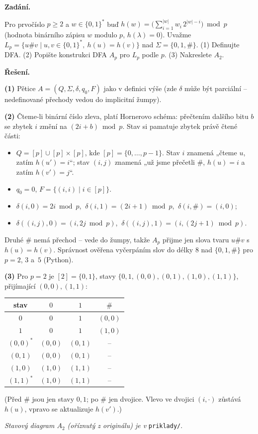 \documentclass[11pt,a4paper]{article}
\begin{document}
\begin{priklad}
\par
\textbf{Zadání.}\par
Pro prvočíslo $p\ge 2$ a $w\in\{0,1\}^*$ buď $h(w)=\big(\sum_{i=1}^{|w|}w_i\,2^{|w|-i}\big)\bmod p$ (hodnota binárního zápisu $w$ modulo $p$, $h(\lambda)=0$). Uvažme $L_p=\{u\#v\mid u,v\in\{0,1\}^*,\ h(u)=h(v)\}$ nad $\Sigma=\{0,1,\#\}$. (1) Definujte DFA. (2) Popište konstrukci DFA $A_p$ pro $L_p$ podle $p$. (3) Nakreslete $A_2$.

\smallskip
\textbf{Řešení.}\par
\textbf{(1)} Pětice $A=(Q,\Sigma,\delta,q_0,F)$ jako v definici výše (zde $\delta$ může být parciální -- nedefinované přechody vedou do implicitní žumpy).

\textbf{(2)} Čteme-li binární číslo zleva, platí Hornerovo schéma: přečtením dalšího bitu $b$ se zbytek $i$ změní na $(2i+b)\bmod p$. Stav si pamatuje zbytek právě čtené části:
\begin{itemize}
  \item $Q=[p]\cup[p]\times[p]$, kde $[p]=\{0,\dots,p-1\}$. Stav $i$ znamená „čteme $u$, zatím $h(u')=i$``; stav $(i,j)$ znamená „už jsme přečetli $\#$, $h(u)=i$ a zatím $h(v')=j$``.
  \item $q_0=0$, $F=\{(i,i)\mid i\in[p]\}$.
  \item $\delta(i,0)=2i\bmod p$, $\ \delta(i,1)=(2i+1)\bmod p$, $\ \delta(i,\#)=(i,0)$;
  \item $\delta((i,j),0)=(i,2j\bmod p)$, $\ \delta((i,j),1)=(i,(2j+1)\bmod p)$.
\end{itemize}
Druhé $\#$ nemá přechod -- vede do žumpy, takže $A_p$ přijme jen slova tvaru $u\#v$ s $h(u)=h(v)$. Správnost ověřena vyčerpáním slov do délky $8$ nad $\{0,1,\#\}$ pro $p=2$, $3$ a~$5$ (Python).

\textbf{(3)} Pro $p=2$ je $[2]=\{0,1\}$, stavy $\{0,1,(0,0),(0,1),(1,0),(1,1)\}$, přijímající $(0,0),(1,1)$:
\begin{center}\small
\begin{tabular}{c|ccc}
\toprule
stav & $0$ & $1$ & $\#$\\
\midrule
$0$ & $0$ & $1$ & $(0,0)$\\
$1$ & $0$ & $1$ & $(1,0)$\\
$(0,0)^{*}$ & $(0,0)$ & $(0,1)$ & --\\
$(0,1)$ & $(0,0)$ & $(0,1)$ & --\\
$(1,0)$ & $(1,0)$ & $(1,1)$ & --\\
$(1,1)^{*}$ & $(1,0)$ & $(1,1)$ & --\\
\bottomrule
\end{tabular}
\end{center}
(Před $\#$ jsou jen stavy $0,1$; po $\#$ jen dvojice. Vlevo ve dvojici $(i,\cdot)$ zůstává $h(u)$, vpravo se aktualizuje $h(v')$.)\par
\emph{Stavový diagram $A_2$ (oříznutý z originálu) je v} \texttt{priklady/}.
\end{priklad}
\end{document}

